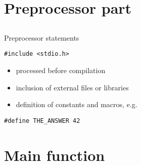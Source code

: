 \section{Preprocessor part}
\subsection{}
\begin{frame}[fragile]{Preprocessor statements}
	\begin{lstlisting}
#include <stdio.h>
\end{lstlisting}
\begin{itemize}
	\item processed before compilation
	\item inclusion of external files or libraries
	\item definition of constants and macros, e.g.
\end{itemize}
\begin{lstlisting}[numbers=none]
#define THE_ANSWER 42
\end{lstlisting}
\end{frame}
\section{Main function}

